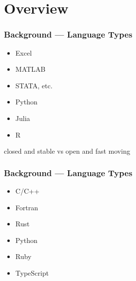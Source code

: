\section{Overview}


\begin{frame}
    \frametitle{Background --- Language Types}
    
    \begin{itemize}
        \item Excel
        \item MATLAB
        \item STATA, etc.
    \end{itemize}
    

    \vspace{0.5em}
    \vspace{0.5em}
    
    \begin{itemize}
        \item Python
        \item Julia
        \item R
    \end{itemize}


    \begin{center}
        closed and stable vs open and fast moving
    \end{center}

\end{frame}





\begin{frame}
    \frametitle{Background --- Language Types}
    
    
    \begin{itemize}
        \item C/C++
        \item Fortran
        \item Rust
    \end{itemize}

    \vspace{1em}


    \begin{itemize}
        \item Python
        \item Ruby
        \item TypeScript
    \end{itemize}

\end{frame}




